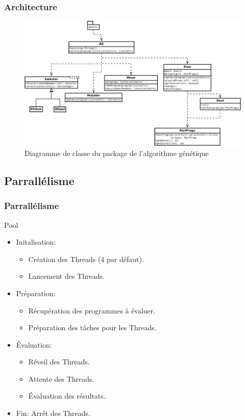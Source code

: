 \documentclass{beamer}
\begin{document}
\begin{frame}
\frametitle{Architecture}
\begin{figure}
	\includegraphics[height=0.7\textheight]{images/diagram-algogen.png}
	\caption{Diagramme de classe du package de l'algorithme génétique}
\end{figure}
\end{frame}

\subsection{Parrallélisme}
\begin{frame}
\frametitle{Parrallélisme}
\begin{block} {Pool}
	\begin{itemize}
		\item Initalisation:	\begin{itemize}
								\item Création des Threads (4 par défaut).
								\item Lancement des Threads.
							\end{itemize}
		\item Préparation:	\begin{itemize}
								\item Récupération des programmes à évaluer.
								\item Préparation des tâches pour les Threads.
							\end{itemize}
		\item Évaluation:	\begin{itemize}
								\item Réveil des Threads.
								\item Attente des Threads.
								\item Évaluation des résultats.
							\end{itemize}
		\item Fin: Arrêt des Threads. 
	\end{itemize}
\end{block} 
\end{frame}
\end{document}
